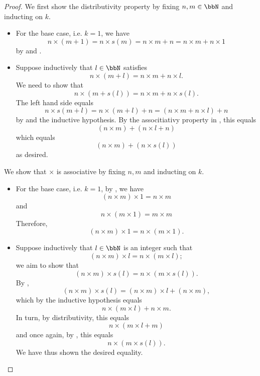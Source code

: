 \begin{proof}

        We first show the distributivity property by fixing $n,m \in \bbN$ and inducting on $k$.  
        \begin{itemize}
            \item For the base case, i.e. $k = 1$, we have 
            $$n \times (m+1) = n \times s(m) = n \times m + n = n \times m + n \times 1$$
            by  and .

            \item Suppose inductively that $l \in \bbN$ satisfies
            $$n \times (m+l) = n \times m + n \times l.$$
            We need to show that 
            $$n \times (m+s(l)) = n \times m + n \times s(l).$$
            The left hand side equals
            $$n \times s(m+l) = n \times (m+l) + n = (n \times m + n \times l) + n$$
            by  and the inductive hypothesis. By the associtiativy property in , this equals 
            $$(n \times m) + (n \times l + n)$$
            which equals
            $$(n \times m) + (n \times s(l))$$
            as desired.
        \end{itemize}


        We show that $\times$ is associative by fixing $n, m$ and inducting on $k$.
        \begin{itemize}
            \item For the base case, i.e. $k = 1$, by , we have
            $$(n \times m) \times 1 = n \times m$$
            and
            $$n \times (m \times 1) = m \times m$$
            Therefore, 
            $$(n \times m) \times 1 = n \times (m \times 1).$$

            \item Suppose inductively that $l \in \bbN$ is an integer such that 
            $$(n \times m) \times l = n \times (m \times l);$$
            we aim to show that 
            $$(n \times m) \times s(l) = n \times (m \times s(l)).$$
            By , 
            $$(n \times m) \times s(l) = (n \times m) \times l + (n \times m),$$
            which by the inductive hypothesis equals 
            $$n \times (m \times l) + n \times m.$$
            In turn, by distributivity, this equals 
            $$n \times (m \times l + m)$$
            and once again, by , this equals 
            $$n \times (m \times s(l)).$$
            We have thus shown the desired equality.
        \end{itemize}


\end{proof}
